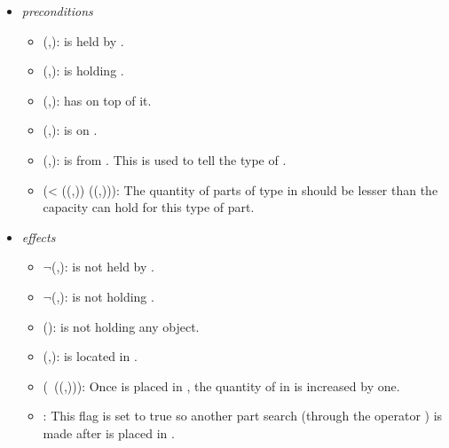 \begin{enumerate}
\begin{itemize}
 \item \textit{preconditions}
 \begin{itemize}
 \item {}(,):  is held by .
 \item {}(,):  is holding .
 \item {}(,):  has  on top of it.
 \item {}(,):  is on .
 \item {}(,):  is from . This is used to tell the type of .
 \item (< ((,)) ((,))): The quantity of parts of type  in  should be lesser than the capacity  can hold for this type of part.
 \end{itemize}
\item \textit{effects}
 \begin{itemize}
 \item $\neg$(,):  is not held by .
 \item $\neg$(,):  is not holding .
 \item {}():  is not holding any object.
 \item {}(,):  is located in .
 \item (\ ((,))): Once  is placed in , the quantity of  in  is increased by one.
 \item {}: This flag is set to true so another part search (through the operator ) is made after  is placed in .
 \end{itemize}
 \end{itemize}


\end{enumerate}
